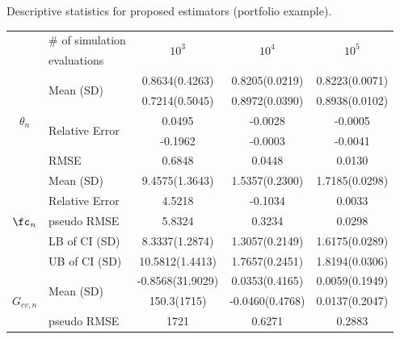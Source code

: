 
\begin{table}[]
\TABLE
{Descriptive statistics for proposed estimators (portfolio example).\label{tab.portfolio}}{
\begin{tabular}{clccc}\toprule
\multicolumn{1}{l}{} & $\#$ of simulation & \multirow{2}{*}{$10^3$} & \multirow{2}{*}{$10^4$} & \multirow{2}{*}{$10^5$} \\
\multicolumn{1}{l}{} & evaluations &  &  &  \\\hline
\multirow{5}{*}{$\theta_n$} & \multirow{2}{*}{Mean (SD)} & 0.8634(0.4263) & 0.8205(0.0219) & 0.8223(0.0071) \\
 &  & 0.7214(0.5045) & 0.8972(0.0390) & 0.8938(0.0102) \\
 & \multirow{2}{*}{Relative Error} & 0.0495 & -0.0028 & -0.0005 \\
 &  & -0.1962 & -0.0003 & -0.0041 \\
 & RMSE & 0.6848 & 0.0448 & 0.0130 \\\hline
\multirow{5}{*}{$\fc_n$} & Mean (SD) & 9.4575(1.3643) & 1.5357(0.2300) & 1.7185(0.0298) \\
 & Relative Error & 4.5218 & -0.1034 & 0.0033 \\
 & pseudo RMSE & 5.8324 & 0.3234 & 0.0298 \\
 & LB of CI (SD) & 8.3337(1.2874) & 1.3057(0.2149) & 1.6175(0.0289) \\
 & UB of CI (SD) & 10.5812(1.4413) & 1.7657(0.2451) & 1.8194(0.0306) \\\hline
\multirow{3}{*}{$G_{cv,n}$} & \multirow{2}{*}{Mean (SD)} & -0.8568(31.9029) & 0.0353(0.4165) & 0.0059(0.1949) \\
 &  & 150.3(1715) & -0.0460(0.4768) & 0.0137(0.2047) \\
 & pseudo RMSE & 1721 & 0.6271 & 0.2883 \\\bottomrule
\end{tabular}}{}
\end{table}